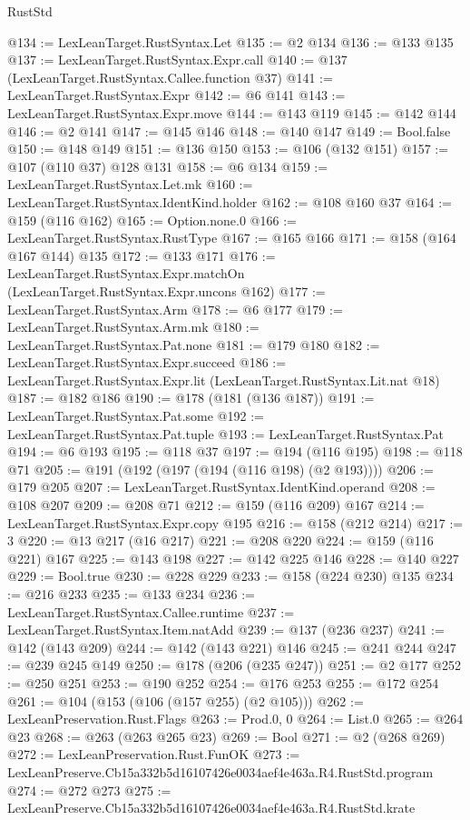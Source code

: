 \begin{lexlean}{RustStd}
\begin{coremodule}
@134 := LexLeanTarget.RustSyntax.Let
@135 := @2 @134
@136 := @133 @135
@137 := LexLeanTarget.RustSyntax.Expr.call
@140 := @137 (LexLeanTarget.RustSyntax.Callee.function @37)
@141 := LexLeanTarget.RustSyntax.Expr
@142 := @6 @141
@143 := LexLeanTarget.RustSyntax.Expr.move
@144 := @143 @119
@145 := @142 @144
@146 := @2 @141
@147 := @145 @146
@148 := @140 @147
@149 := Bool.false
@150 := @148 @149
@151 := @136 @150
@153 := @106 (@132 @151)
@157 := @107 (@110 @37) @128 @131
@158 := @6 @134
@159 := LexLeanTarget.RustSyntax.Let.mk
@160 := LexLeanTarget.RustSyntax.IdentKind.holder
@162 := @108 @160 @37
@164 := @159 (@116 @162)
@165 := Option.none.{0}
@166 := LexLeanTarget.RustSyntax.RustType
@167 := @165 @166
@171 := @158 (@164 @167 @144) @135
@172 := @133 @171
@176 := LexLeanTarget.RustSyntax.Expr.matchOn (LexLeanTarget.RustSyntax.Expr.uncons @162)
@177 := LexLeanTarget.RustSyntax.Arm
@178 := @6 @177
@179 := LexLeanTarget.RustSyntax.Arm.mk
@180 := LexLeanTarget.RustSyntax.Pat.none
@181 := @179 @180
@182 := LexLeanTarget.RustSyntax.Expr.succeed
@186 := LexLeanTarget.RustSyntax.Expr.lit (LexLeanTarget.RustSyntax.Lit.nat @18)
@187 := @182 @186
@190 := @178 (@181 (@136 @187))
@191 := LexLeanTarget.RustSyntax.Pat.some
@192 := LexLeanTarget.RustSyntax.Pat.tuple
@193 := LexLeanTarget.RustSyntax.Pat
@194 := @6 @193
@195 := @118 @37
@197 := @194 (@116 @195)
@198 := @118 @71
@205 := @191 (@192 (@197 (@194 (@116 @198) (@2 @193))))
@206 := @179 @205
@207 := LexLeanTarget.RustSyntax.IdentKind.operand
@208 := @108 @207
@209 := @208 @71
@212 := @159 (@116 @209) @167
@214 := LexLeanTarget.RustSyntax.Expr.copy @195
@216 := @158 (@212 @214)
@217 := 3
@220 := @13 @217 (@16 @217)
@221 := @208 @220
@224 := @159 (@116 @221) @167
@225 := @143 @198
@227 := @142 @225 @146
@228 := @140 @227
@229 := Bool.true
@230 := @228 @229
@233 := @158 (@224 @230) @135
@234 := @216 @233
@235 := @133 @234
@236 := LexLeanTarget.RustSyntax.Callee.runtime
@237 := LexLeanTarget.RustSyntax.Item.natAdd
@239 := @137 (@236 @237)
@241 := @142 (@143 @209)
@244 := @142 (@143 @221) @146
@245 := @241 @244
@247 := @239 @245 @149
@250 := @178 (@206 (@235 @247))
@251 := @2 @177
@252 := @250 @251
@253 := @190 @252
@254 := @176 @253
@255 := @172 @254
@261 := @104 (@153 (@106 (@157 @255) (@2 @105)))
@262 := LexLeanPreservation.Rust.Flags
@263 := Prod.{0, 0}
@264 := List.{0}
@265 := @264 @23
@268 := @263 (@263 @265 @23)
@269 := Bool
@271 := @2 (@268 @269)
@272 := LexLeanPreservation.Rust.FunOK
@273 := LexLeanPreserve.Cb15a332b5d16107426e0034aef4e463a.R4.RustStd.program
@274 := @272 @273
@275 := LexLeanPreserve.Cb15a332b5d16107426e0034aef4e463a.R4.RustStd.krate

\end{coremodule}
\end{lexlean}
